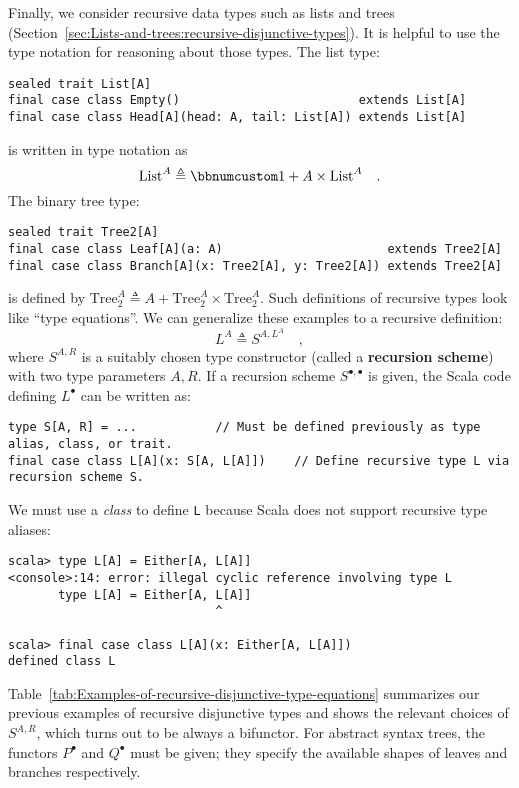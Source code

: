 Finally, we consider recursive data types such as lists and trees
(Section~\ref{sec:Lists-and-trees:recursive-disjunctive-types}).
It is helpful to use the type notation for reasoning about those types.
The list type:
\begin{lstlisting}
sealed trait List[A]
final case class Empty()                         extends List[A]
final case class Head[A](head: A, tail: List[A]) extends List[A]
\end{lstlisting}
is written in type notation as
\[
\text{List}^{A}\triangleq\bbnum 1+A\times\text{List}^{A}\quad.
\]
The binary tree type:
\begin{lstlisting}
sealed trait Tree2[A]
final case class Leaf[A](a: A)                       extends Tree2[A]
final case class Branch[A](x: Tree2[A], y: Tree2[A]) extends Tree2[A]
\end{lstlisting}
is defined by $\text{Tree}_{2}^{A}\triangleq A+\text{Tree}_{2}^{A}\times\text{Tree}_{2}^{A}$.
Such definitions of recursive types look like \textsf{``}type equations\textsf{''}.
We can generalize these examples to a recursive definition:
\begin{equation}
L^{A}\triangleq S^{A,L^{A}}\quad,\label{eq:f-def-recursive-functor}
\end{equation}
where $S^{A,R}$ is a suitably chosen type constructor (called a \textbf{recursion
scheme}) with two type parameters $A,R$. If a recursion scheme $S^{\bullet,\bullet}$
is given, the Scala code defining $L^{\bullet}$ can be written as:
\begin{lstlisting}
type S[A, R] = ...           // Must be defined previously as type alias, class, or trait.
final case class L[A](x: S[A, L[A]])    // Define recursive type L via recursion scheme S.
\end{lstlisting}
We must use a \emph{class} to define \lstinline!L! because Scala
does not support recursive type aliases:
\begin{lstlisting}
scala> type L[A] = Either[A, L[A]]
<console>:14: error: illegal cyclic reference involving type L
       type L[A] = Either[A, L[A]]
                             ^

scala> final case class L[A](x: Either[A, L[A]])
defined class L
\end{lstlisting}

Table~\ref{tab:Examples-of-recursive-disjunctive-type-equations}
summarizes our previous examples of recursive disjunctive types and
shows the relevant choices of $S^{A,R}$, which turns out to be always
a bifunctor. For abstract syntax trees, the functors $P^{\bullet}$
and $Q^{\bullet}$ must be given; they specify the available shapes
of leaves and branches respectively. 

